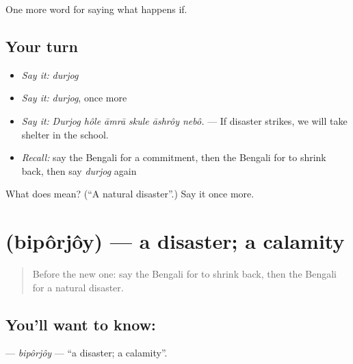 \begin{grammarlens}[title={What you've built}]
One more word for saying what happens if.
\end{grammarlens}

\subsection*{Your turn}
\begin{itemize}
\raggedright
  \item \emph{Say it:} \emph{durjog}
  \item \emph{Say it:} \emph{durjog}, once more
  \item \emph{Say it:} \emph{Durjog hôle āmrā skule āshrôy nebô.} — If disaster strikes, we will take shelter in the school.
  \item \emph{Recall:} say the Bengali for a commitment, then the Bengali for to shrink back, then say \emph{durjog} again
\end{itemize}

\begin{tcolorbox}[breakable,colback=teal!4,colframe=teal!35!black,title={Before you move on}]
What does  mean? (\textquotedblleft{}A natural disaster\textquotedblright{}.) Say it once more.
\end{tcolorbox}
\section[\texorpdfstring{\bn{বিপর্যয়} (bipôrjôy)}{বিপর্যয় (bipôrjôy)}]{ (bipôrjôy) — a disaster; a calamity}

\label{lesson:BN-C538-biporjoy}



\begin{quote}
Before the new one: say the Bengali for to shrink back, then the Bengali for a natural disaster.
\end{quote}

\subsection*{You'll want to know: }
\textbf{} — \emph{bipôrjôy} — \textquotedblleft{}a disaster; a calamity\textquotedblright{}.

\begin{quote}
     
\end{quote}

